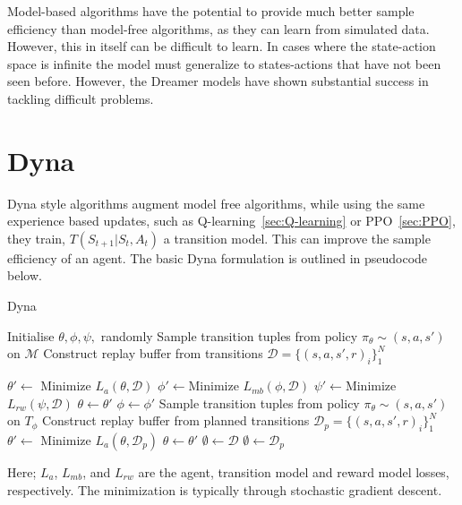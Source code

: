 Model-based algorithms have the potential to provide much better sample efficiency than model-free algorithms, as they can learn from simulated data. However, this in itself can be difficult to learn. In cases where the state-action space is infinite the model must generalize to states-actions that have not been seen before. However, the Dreamer models have shown substantial success in tackling difficult problems\cite{hafner2023mastering, hafner2020mastering}.

\section{Dyna} \label{sec:Dyna}
Dyna style algorithms\cite{sutton2018reinforcement, sutton2012dyna} augment model free algorithms, while using the same experience based updates, such as Q-learning~\ref{sec:Q-learning} or PPO~\ref{sec:PPO}, they train, $T(S_{t+1}|S_t, A_t)$ a transition model. This can improve the sample efficiency of an agent. The basic Dyna formulation is outlined in pseudocode below.
\begin{algorithm}\label{algo:Dyna}
	\caption{Dyna}
	\begin{algorithmic}
		\State Initialise $\theta, \phi, \psi,$ randomly
		\State Sample transition tuples from policy $\pi_\theta \sim (s, a, s')$ on $\mathcal{M}$
		\State Construct replay buffer from transitions $\mathcal{D} = \{(s, a, s', r)_i\}_1^N$

		\State $\theta' \leftarrow$ Minimize $L_{a}(\theta, \mathcal{D})$
		\State $\phi' \leftarrow $Minimize $L_{mb}(\phi , \mathcal{D})$
		\State $\psi' \leftarrow $Minimize $L_{rw}(\psi , \mathcal{D})$
		\EndFor
		\State $\theta \leftarrow \theta'$
		\State $\phi \leftarrow \phi'$
		\State Sample transition tuples from policy $\pi_\theta \sim (s, a, s')$ on $T_\phi$
		\State Construct replay buffer from planned transitions $\mathcal{D}_{p} = \{(s, a, s', r)_i\}_1^N$
		\State $\theta' \leftarrow$ Minimize $L_{a}(\theta, \mathcal{D}_p)$
		\EndFor
		\State $\theta \leftarrow \theta'$
		\State $\emptyset \leftarrow \mathcal{D}$
		\State $\emptyset \leftarrow \mathcal{D}_p$
		\EndFor
	\end{algorithmic}
\end{algorithm}
Here; $L_{a}$, $L_{mb}$, and $L_{rw}$ are the agent, transition model and reward model losses, respectively. The minimization is typically through stochastic gradient descent.

